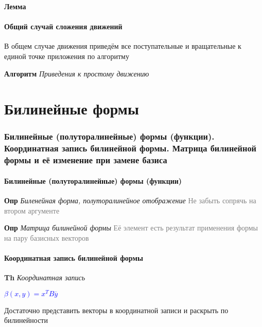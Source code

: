 \documentclass[a4paper, 14pt]{article}
\begin{document}
    \textbf{Лемма}
    
    \subsection{Общий случай сложения движений}
    
    В общем случае движения приведём все поступательные и вращательные к единой точке приложения по алгоритму
    
    \textbf{Алгоритм} \textit{Приведения к простому движению}
    
     \part*{Билинейные формы}
    
    \section{Билинейные (полуторалинейные) формы (функции).
    Координатная запись билинейной формы.
    Матрица билинейной формы и её изменение при замене базиса}
    
    \subsection{}
    
    \subsection{Билинейные (полуторалинейные) формы (функции)}
    
    \textbf{Опр} \textit{Биленейная форма, полуторалинейное отображение} \textcolor{gray}{Не забыть сопрячь на втором
    аргументе}
    
    \textbf{Опр} \textit{Матрица билинейной формы} \textcolor{gray}{Её элемент есть результат применения формы на
    пару базисных векторов}
    
    \subsection{Координатная запись билинейной формы}
    
    \textbf{Th} \textit{Координатная запись}
    
    \textcolor{blue}{$\beta (x, y) = x^T B \overline{y}$}
    
    Достаточно представить векторы в координатной записи и раскрыть по билинейности
    
\end{document}
